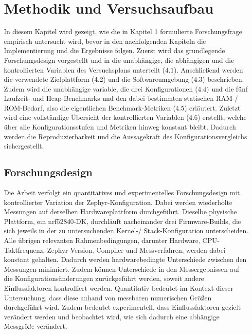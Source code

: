 \chapter{Methodik und Versuchsaufbau}
\label{ch:methodik-und-versuchsaufbau}

In diesem Kapitel wird gezeigt, wie die in Kapitel 1 formulierte Forschungsfrage empirisch untersucht wird, bevor in den nachfolgenden Kapiteln die Implementierung und die Ergebnisse folgen. Zuerst wird das grundlegende Forschungsdesign vorgestellt und in die unabh{\"a}ngige, die abh{\"a}ngigen und die kontrollierten Variablen des Versuchsplans unterteilt (4.1). Anschlie{\ss}end werden die verwendete Zielplattform (4.2) und die Softwareumgebung (4.3) beschrieben. Zudem wird die unabh{\"a}ngige variable, die drei Konfigurationen (4.4) und die f{\"u}nf Laufzeit- und Heap-Benchmarks und den dabei bestimmten statischen RAM-/ ROM-Bedarf, also die eigentlichen Benchmark-Metriken (4.5) erl{\"a}utert. Zuletzt wird eine vollst{\"a}ndige {\"U}bersicht der kontrollierten Variablen (4.6) erstellt, welche {\"u}ber alle Konfigurationsstufen und Metriken hinweg konstant bleibt. Dadurch werden die Reproduzierbarkeit und die Aussagekraft des Konfigurationsvergleichs sichergestellt.

\section{Forschungsdesign}
Die Arbeit verfolgt ein quantitatives und experimentelles Forschungsdesign mit kontrollierter Variation der Zephyr-Konfiguration. Dabei werden wiederholte Messungen auf derselben Hardwareplattform durchgef{\"u}hrt. Dieselbe physische Plattform, ein nrf52840-DK, durchl{\"a}uft nacheinander drei Firmware-Builds, die sich jeweils in der zu untersuchenden Kernel-/ Stack-Konfiguration unterscheiden. Alle {\"u}brigen relevanten Rahmenbedingungen, darunter Hardware, CPU-Taktfrequenz, Zephyr-Version, Compiler und Messverfahren, werden dabei konstant gehalten. Dadurch werden hardwarebedingte Unterschiede zwischen den Messungen minimiert. Zudem k{\"o}nnen Unterschiede in den Messergebnissen auf die Konfigurations{\"a}nderungen zur{\"u}ckgef{\"u}hrt werden, soweit andere Einflussfaktoren kontrolliert werden. Quantitativ bedeutet im Kontext dieser Untersuchung, dass diese anhand von messbaren numerischen Gr{\"o}{\ss}en durchgef{\"u}hrt wird. Zudem bedeutet experimentell, dass Einflussfaktoren gezielt ver{\"a}ndert werden und beobachtet wird, wie sich dadurch eine abh{\"a}ngige Messgr{\"o}{\ss}e ver{\"a}ndert.

